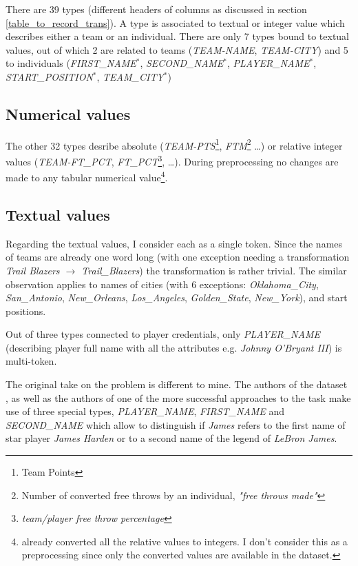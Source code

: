 There are 39 types (different headers of columns as discussed in section \ref{table_to_record_trans}). A type is associated to textual or integer value which describes either a team or an individual. There are only 7 types bound to textual values, out of which 2 are related to teams (\emph{TEAM-NAME}, \emph{TEAM-CITY}) and 5 to individuals (\emph{FIRST\_NA\-ME}$^*$, \emph{SE\-COND\_NAME}$^*$, \emph{PLAYER\_NAME}$^*$, \emph{START\_POSITION}$^*$, \emph{TEAM\_CI\-TY}$^*$)

\subsection{Numerical values}

The other 32 types desribe absolute (\emph{TEAM-PTS}\footnote{Team Points}, \emph{FTM}\footnote{Number of converted free throws by an individual, \emph{"free throws made"}} \dots) or relative integer values (\emph{TEAM-FT\_PCT}, \emph{FT\_PCT}\footnote{\emph{team/player free throw percentage}}, \dots). During preprocessing no changes are made to any tabular numerical value\footnote{\citep{wiseman2017} already converted all the relative values to integers. I don't consider this as a preprocessing since only the converted values are available in the dataset.}.

\subsection{Textual values} \label{subsection:table_text_transformations}

Regarding the textual values, I consider each as a single token. Since the names of teams are already one word long (with one exception needing a transformation \emph{Trail Blazers $\rightarrow$ Trail\_Blazers}) the transformation is rather trivial. The similar observation applies to names of cities (with 6 exceptions: \emph{Oklahoma\_City}, \emph{San\_Antonio}, \emph{New\_Orleans}, \emph{Los\_Angeles}, \emph{Golden\_State}, \emph{New\_York}), and start positions.

Out of three types connected to player credentials, only \emph{PLAYER\_NAME} (describing player full name with all the attributes e.g. \emph{Johnny O'Bryant III}) is multi-token.

The original take on the problem is different to mine. The authors of the dataset \citep{wiseman2017}, as well as the authors of one of the more successful approaches to the task \citep{puduppully2019datatotext} make use of three special types, \emph{PLAYER\_NAME}, \emph{FIRST\_NAME} and \emph{SECOND\_NAME} which allow to distinguish if \emph{James} refers to the first name of star player \emph{James Harden} or to a second name of the legend of \emph{LeBron James}.

